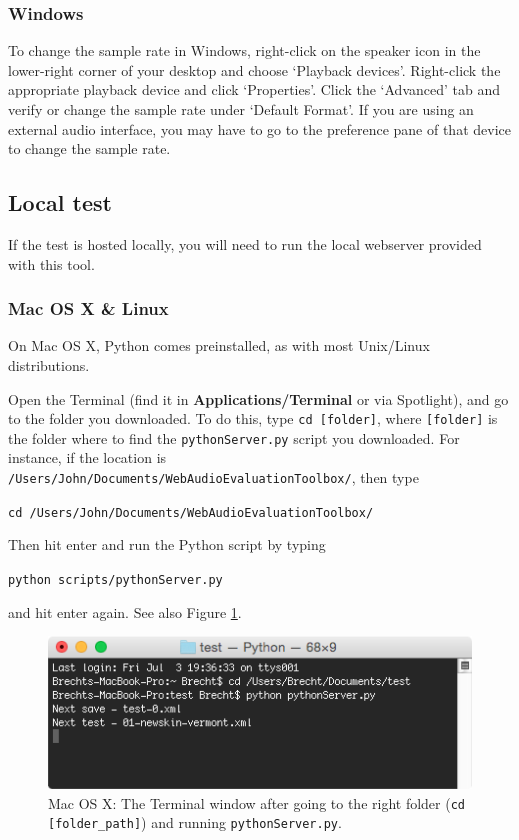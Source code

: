 \documentclass[11pt, oneside]{article}   	%
\begin{document}
		\subsubsection{Windows}
			To change the sample rate in Windows, right-click on the speaker icon in the lower-right corner of your desktop and choose `Playback devices'. Right-click the appropriate playback device and click `Properties'. Click the `Advanced' tab and verify or change the sample rate under `Default Format'.    %
			If you are using an external audio interface, you may have to go to the preference pane of that device to change the sample rate.

	\subsection{Local test}
		If the test is hosted locally, you will need to run the local webserver provided with this tool. 
		
		\subsubsection{Mac OS X \& Linux}

			On Mac OS X, Python comes preinstalled, as with most Unix/Linux distributions.

			Open the Terminal (find it in \textbf{Applications/Terminal} or via Spotlight), and go to the folder you downloaded. To do this, type \texttt{cd [folder]}, where \texttt{[folder]} is the folder where to find the \texttt{pythonServer.py} script you downloaded. For instance, if the location is \texttt{/Users/John/Documents/WebAudioEvaluationToolbox/}, then type
			
				\texttt{cd /Users/John/Documents/WebAudioEvaluationToolbox/}
				
			Then hit enter and run the Python script by typing

				\texttt{python scripts/pythonServer.py}

			and hit enter again. See also Figure \ref{fig:terminal}.
			
			\begin{figure}[htbp]
	                \begin{center}
	                \includegraphics[width=.75\textwidth]{pythonServer.png}
	                \caption{Mac OS X: The Terminal window after going to the right folder (\texttt{cd [folder\_path]}) and running \texttt{pythonServer.py}.}
	                \label{fig:terminal}
	                \end{center}
	                \end{figure}
\end{document}
